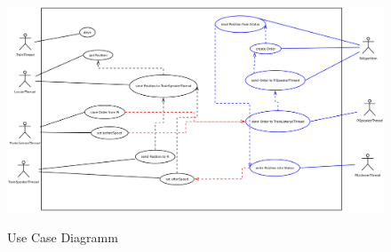 \begin{figure}[H]	
\caption{Use Case Diagramm}
\includegraphics[width=2\textwidth, width=465pt]{content/images/UseCaseDia.png}
\label{pic:UseCaseDiagram}
\end{figure}
